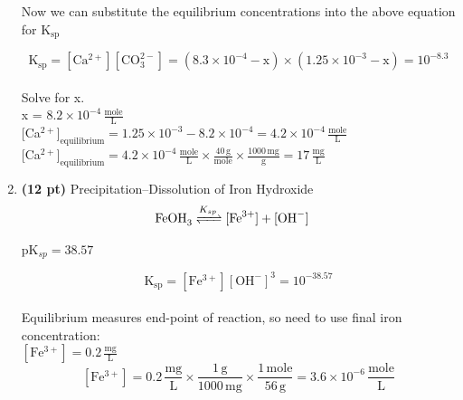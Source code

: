 \documentclass[12pt,letterpaper]{article}
\begin{document}
\begin{enumerate}
\begin{minipage}{\linewidth}
\begin{tabular}{|c|c|c|p{3.1cm}|}
\bottomrule[1.25pt]

\end {tabular}\par
\end{minipage}\\\\

Now we can substitute the equilibrium concentrations into the above equation for K$\mathrm{_{sp}}$

\begin{equation*}
\mathrm{K_{sp} = [Ca^{2+}][CO_3^{2-}]= (8.3\times 10^{-4} - x)\times(1.25\times 10^{-3} -x) = 10^{-8.3}}
\end{equation*}\\

Solve for x. \\

x = $\mathrm{8.2 \times 10^{-4}\, \frac{mole}{L}}$\\

[Ca$\mathrm{^{2+}]_{equilibrium} = 1.25\times 10^{-3} - 8.2 \times 10^{-4} = 4.2 \times 10^{-4}\, \frac{mole}{L}}$\\

[Ca$\mathrm{^{2+}]_{equilibrium}  = 4.2 \times 10^{-4}\, \frac{mole}{L}\times \frac{40\, g}{mole}\times \frac{1000\, mg}{g} = 17\, \frac{mg}{L}}$\\

\vspace{0.2in}

\item \textbf{(12 pt)}  Precipitation--Dissolution of Iron Hydroxide\\

\begin{align*}
\cee{FeOH_3 &<=>[K_{sp}] [Fe^{3+}] + [OH^{-}]} 
\end{align*}

pK$_{sp} = 38.57$

\begin{equation*}
\mathrm{K_{sp} = [Fe^{3+}][OH^{-}]^3=  10^{-38.57}}
\end{equation*}\\

Equilibrium measures end-point of reaction, so need to use final iron concentration:\\

$\mathrm{[Fe^{3+}] = 0.2\, \frac{mg}{L}}$\\

\begin{equation*}
\mathrm{[Fe^{3+}] = 0.2\, \frac{mg}{L}\times \frac{1\, g}{1000\, mg} \times \frac{1\, mole}{56\, g} = 3.6 \times 10^{-6}\, \frac{mole}{L}}
\end{equation*}


\end{enumerate}
\end{document}

